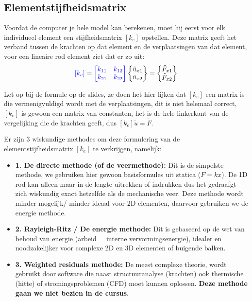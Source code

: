 \documentclass[a4paper,11pt,twoside]{report}
\begin{document}
\subsection{Elementstijfheidsmatrix}
Voordat de computer je hele model kan berekenen, moet hij eerst voor elk individueel element een
stijfheidsmatrix $[k_e]$ opstellen. Deze matrix geeft het verband tussen de krachten op dat element
en de verplaatsingen van dat element, voor een lineaire rod element ziet dat er zo uit:
\begin{align*}
    {\color{blue}[k_e]} =
        {\color{blue}\begin{bmatrix}
                             k_{11} & k_{12} \\
                             k_{21} & k_{22}
                         \end{bmatrix}}
    \begin{Bmatrix}
        \tilde{u}_{x1} \\
        \tilde{u}_{x2}
    \end{Bmatrix}
    =
    \begin{Bmatrix}
        \tilde{F}_{x1} \\
        \tilde{F}_{x2}
    \end{Bmatrix}
\end{align*}

\begin{warningbox}
    Let op bij de formule op de slides, ze doen het hier lijken dat $[k_e]$ een matrix is die
    vermenigvuldigd wordt met de verplaatsingen, dit is niet helemaal correct, $[k_e]$ is gewoon een
    matrix van constanten, het is de hele linkerkant van de vergelijking die de krachten geeft, dus
    $[k_e] \tilde{u} = \tilde{F}$.
\end{warningbox}

Er zijn 3 wiskundige methodes om deze formulering van de elementstijfheidsmatrix $[k_e]$ te
verkrijgen, namelijk:
\begin{itemize}
    \item \textbf{1. De directe methode (of de veermethode):} Dit is de simpelste methode, we gebruiken
          hier gewoon basisformules uit statica ($F = kx$). De 1D rod kan alleen maar in de lengte uitrekken
          of indrukken dus het gedraafgt zich wiskundig exact hetzelfde als de mechanische veer. Deze methode
          wordt minder mogelijk/ minder ideaal voor 2D elementen, daarvoor gebruiken we de energie methode.
    \item \textbf{2. Rayleigh-Ritz / De energie methode:} Dit is gebaseerd op de wet van behoud van
          energie (arbeid = interne vervormingsenergie), idealer en noodzakelijker voor complexe 2D en 3D
          elementen of buigende balken.
    \item \textbf{3. Weighted residuals methode:} De meest complexe theorie, wordt gebruikt door
          software die naast structuuranalyse (krachten) ook thermische (hitte) of stromingsproblemen (CFD)
          moet kunnen oplossen. \textbf{Deze methode gaan we niet bezien in de cursus.}
\end{itemize}
\end{document}
